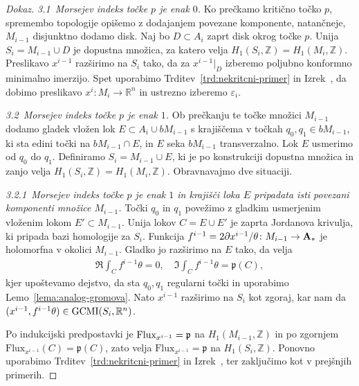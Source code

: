 \documentclass[12pt,a4paper,twoside]{article}
\theoremstyle{definition} %
\newenvironment{dokaz}[1][Dokaz]{\begin{proof}[#1]}{\end{proof}}
\theoremstyle{plain} %
\numberwithin{equation}{section}  %
\newcommand{\Z}{\mathbb Z}
\begin{document}
\begin{dokaz}
\textit{3.1~Morsejev indeks točke $p$ je enak $0$.} \newline
Ko prečkamo kritično točko $p$, spremembo topologije opišemo z dodajanjem povezane komponente, natančneje, $M_{i-1}$ disjunktno dodamo disk.
Naj bo $D \subset A_{i}$ zaprt disk okrog točke $p$. Unija $S_{i} = M_{i-1} \cup D$ je dopustna množica, za katero velja $H_{1}(S_{i}, \mathbb{Z}) = H_{1}(M_{i}, \mathbb{Z})$.
Preslikavo $x^{i-1}$ razširimo na $S_{i}$ tako, da za $x^{i-1}|_{D}$ izberemo poljubno konformno minimalno imerzijo.
Spet uporabimo Trditev~\ref{trd:nekritcni-primer} in Izrek~\cite[Theorem~3.4.1]{alarcon2021minimal},
da dobimo preslikavo $x^{i} \colon M_{i} \to \mathbb{R}^{n}$ in ustrezno izberemo $\varepsilon_{i}$. \newline

\textit{3.2~Morsejev indeks točke $p$ je enak $1$.} \newline
Ob prečkanju te točke množici $M_{i-1}$ dodamo gladek vložen lok $E \subset A_{i} \cup bM_{i-1}$ s krajiščema v točkah $q_0, q_1 \in bM_{i-1}$, ki sta edini točki na $bM_{i-1} \cap E$, in $E$ seka $bM_{i-1}$ transverzalno. Lok $E$ usmerimo od $q_0$ do $q_1$.
Definiramo $S_{i} = M_{i-1} \cup E$, ki je po konstrukciji dopustna množica in zanjo velja $H_{1}(S_{i}, \mathbb{Z}) = H_{1}(M_{i}, \mathbb{Z})$. Obravnavajmo dve situaciji. \newline

\textit{3.2.1~Morsejev indeks točke $p$ je enak $1$ in krajišči loka $E$ pripadata isti povezani komponenti množice $M_{i-1}$.} \newline
Točki $q_0$ in $q_1$ povežimo z gladkim usmerjenim vloženim lokom $E' \subset M_{i-1}$. 
Unija lokov $C = E \cup E'$ je zaprta Jordanova krivulja, ki pripada bazi homologije za $S_{i}$.
Funkcija $f^{i-1} = 2 \partial x^{i-1} / \theta \colon M_{i-1} \to \textup{\textbf{A}}_{*}$ je holomorfna v okolici $M_{i-1}$.
Gladko jo razširimo na $E$ tako, da velja
\begin{gather*}
\Re \int_{C} f^{i-1} \theta = 0, \quad \Im \int_{C} f^{i-1} \theta = \mathfrak{p}(C),
\end{gather*}
kjer upoštevamo dejstvo, da sta $q_0, q_1$ regularni točki in uporabimo Lemo~\ref{lema:analog-gromova}.
Nato $x^{i-1}$ razširimo na $S_{i}$ kot zgoraj, kar nam da $(x^{i-1}, f^{i-1} \theta) \in \textup{GCMI}(S_{i}, \mathbb{R}^{n})$.

Po indukcijski predpostavki je $\textup{Flux}_{x^{i-1}} = \mathfrak{p}$ na $H_{1}(M_{i-1},\Z)$ in po zgornjem $\text{Flux}_{x^{i-1}}(C) = \mathfrak{p}(C)$, zato velja
$\text{Flux}_{x^{i-1}} = \mathfrak{p}$ na $H_{1}(S_{i},\Z)$.
Ponovno uporabimo Trditev~\ref{trd:nekritcni-primer} in Izrek~\cite[Theorem~3.4.1]{alarcon2021minimal},
ter zaključimo kot v prejšnjih primerih. \newline


\end{dokaz}
\end{document}
